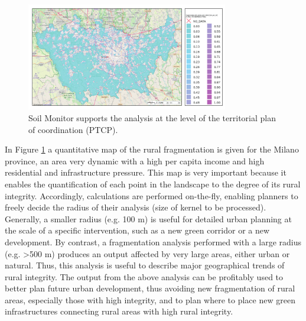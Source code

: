 \documentclass[APA,LATO1COL,doublespace]{WileyNJD-v2}
\begin{document}

\begin{figure}[t] %
    \centerline{\includegraphics[width=250pt]{daMileti/06_caso_provinciale.pdf}}
    \caption{ Soil Monitor supports the analysis at the level of the territorial plan of coordination (PTCP). } \label{fig:casePROV}
\end{figure}

In Figure \ref{fig:casePROV} a quantitative map of the rural fragmentation is given for the Milano province, an area very dynamic with a high per capita income and high residential and infrastructure pressure. 
This map is very important because it enables the quantification of each point in the landscape to the degree of its rural integrity. 
Accordingly, calculations are performed on-the-fly, enabling planners to freely decide the radius of their analysis (size of kernel to be processed).
Generally, a smaller radius (e.g. 100 m) is useful for detailed urban planning at the scale of a specific intervention, such as a new green corridor or a new development.
By contrast, a fragmentation analysis performed with a large radius (e.g. >500 m) produces an output affected by very large areas, either urban or natural. 
Thus, this analysis is useful to describe major geographical trends of rural integrity.
The output from the above analysis can be profitably used to better plan future urban development, thus avoiding new fragmentation of rural areas, especially those with high integrity, and to plan where to place new green infrastructures connecting rural areas with high rural integrity.
\end{document}
